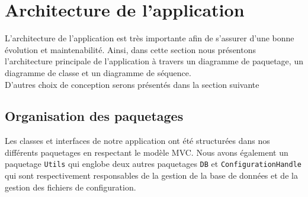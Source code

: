 \documentclass[10pt,a4paper]{article}
\begin{document}
\newpage


\section{Architecture de l'application}

L'architecture de l'application est très importante afin de s'assurer d'une bonne évolution et maintenabilité. Ainsi, dans cette section nous présentons l'architecture principale de l'application à travers un diagramme de paquetage, un diagramme de classe et un diagramme de séquence. \\
D'autres choix de conception serons présentés dans la section suivante  \textit{}

\subsection{Organisation des paquetages}
Les classes et interfaces de notre application ont été structurées dans nos différents paquetages en respectant le modèle MVC. Nous avons également un paquetage \verb|Utils| qui englobe deux autres paquetages \verb|DB| et  \verb|ConfigurationHandle| qui sont respectivement responsables de la gestion de la base de données et de la gestion des fichiers de configuration.
\end{document}
